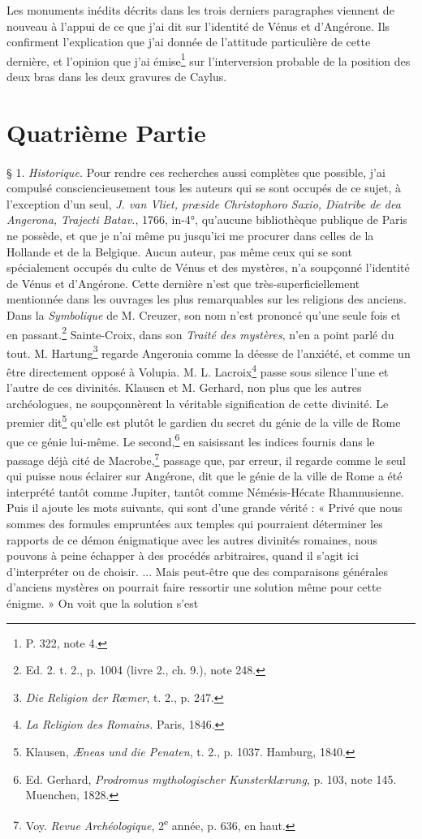 \documentclass[a4paper, 11pt, oneside, polutonikogreek, french]{article}
\begin{document}
Les monuments inédits décrits dans les trois derniers paragraphes viennent de nouveau à l'appui de ce que j'ai dit sur l'identité de Vénus et d'Angérone. Ils confirment l'explication que j'ai donnée de l'attitude particulière de cette dernière, et l'opinion que j'ai émise\footnote{P. 322, note 4.} sur l'interversion probable de la position des deux bras dans les deux gravures de Caylus.
\clearpage
\section{Quatrième Partie}
\paragraph{}
§ 1. \emph{Historique.} Pour rendre ces recherches aussi complètes que possible, j'ai compulsé consciencieusement tous les auteurs qui se sont occupés de ce sujet, à l'exception d'un seul, \emph{J. van Vliet, præside Christophoro Saxio, Diatribe de dea Angerona, Trajecti Batav.}, 1766, in-4°, qu'aucune bibliothèque publique de Paris ne possède, et que je n'ai même pu jusqu'ici me procurer dans celles de la Hollande et de la Belgique. Aucun auteur, pas même ceux qui se sont spécialement occupés du culte de Vénus et des mystères, n'a soupçonné l'identité de Vénus et d'Angérone. Cette dernière n'est que très-superficiellement mentionnée dans les ouvrages les plus remarquables sur les religions des anciens. Dans la \emph{Symbolique} de M. Creuzer, son nom n'est prononcé qu'une seule fois et en passant.\footnote{Ed. 2. t. 2., p. 1004 (livre 2., ch. 9.), note 248.} Sainte-Croix, dans son \emph{Traité des mystères}, n'en a point parlé du tout. M. Hartung\footnote{\emph{Die Religion der Rœmer}, t. 2., p. 247.} regarde Angeronia comme la déesse de l'anxiété, et comme un être directement opposé à Volupia. M. L. Lacroix\footnote{\emph{La Religion des Romains.} Paris, 1846.} passe sous silence l'une et l'autre de ces divinités. Klausen et M. Gerhard, non plus que les autres archéologues, ne soupçonnèrent la véritable signification de cette divinité. Le premier dit\footnote{Klausen, \emph{Æneas und die Penaten}, t. 2., p. 1037. Hamburg, 1840.} qu'elle est plutôt le gardien du secret du génie de la ville de Rome que ce génie lui-même. Le second,\footnote{Ed. Gerhard, \emph{Prodromus mythologischer Kunsterklærung}, p. 103, note 145. Muenchen, 1828.} en saisissant les indices fournis dans le passage déjà cité de Macrobe,\footnote{Voy. \emph{Revue Archéologique}, 2\textsuperscript{e} année, p. 636, en haut.} passage que, par erreur, il regarde comme le seul qui puisse nous éclairer sur Angérone, dit que le génie de la ville de Rome a été interprété tantôt comme Jupiter, tantôt comme Némésis-Hécate Rhamnusienne. Puis il ajoute les mots suivants, qui sont d'une grande vérité : « Privé que nous sommes des formules empruntées aux temples qui pourraient déterminer les rapports de ce démon énigmatique avec les autres divinités romaines, nous pouvons à peine échapper à des procédés arbitraires, quand il s'agit ici d'interpréter ou de choisir. ... Mais peut-être que des comparaisons générales d'anciens mystères on pourrait faire ressortir une solution même pour cette énigme. » On voit que la solution s'est 
\end{document}
